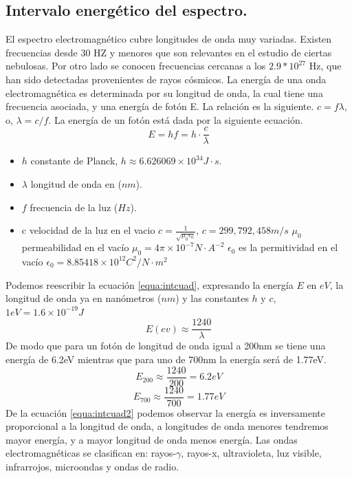 \subsection{Intervalo energético del espectro.}
El espectro electromagnético cubre longitudes de onda muy variadas. Existen frecuencias desde 30 HZ y menores que son relevantes en el estudio de ciertas nebulosas. Por otro lado se conocen frecuencias cercanas a los  $2.9*10^{27}$ Hz, que han sido detectadas provenientes de rayos cósmicos.
La energía de una onda electromagnética es determinada por su longitud de onda, la cual tiene una frecuencia asociada, y una energía de fotón E. La relación es la siguiente.
$c = f\lambda$, o, $\lambda = c/f$. La energía de un fotón está dada por la siguiente ecuación.
\begin{equation}
E = hf =h\cdot \frac{c}{\lambda}
\label{equa:intcuad}
\end{equation}
\begin{itemize}
	\item $h$ constante de Planck, $h \approx 6.626069\times 10^{34} J\cdot s$.
	\item $\lambda$ longitud de onda en ($nm$).
	\item $f$ frecuencia de la luz ($Hz$).
	\item c velocidad de la luz en el vacio $c = \frac{1}{\sqrt{\mu_0\epsilon_0}}$, $c = 299,792,458 m/s$
	\subitem $\mu_0$ permeabilidad en el vacío $\mu_0 = 4\pi\times10^{-7} N\cdot A^{-2}$
	\subitem $\epsilon_0$ es la permitividad en el vacío $\epsilon_0 = 8.85418\times10^{12} C^2/N\cdot m^2$
	
\end{itemize}
Podemos reescribir la ecuación \ref{equa:intcuad}, expresando la energía $E$ en $eV$, la longitud de onda ya en nanómetros ($nm$) y las constantes $h$ y $c$, $1eV = 1.6\times 10^{-19} J$
\begin{equation}
E(ev)\approx \frac{1240}{\lambda}
\label{equa:intcuad2}
\end{equation}
De modo que para un fotón de longitud de onda igual a 200nm se tiene una energía de 6.2eV mientras que para uno de 700nm la energía será de 1.77eV.
$$E_{200}\approx \frac{1240}{200}=6.2eV $$
$$E_{700}\approx \frac{1240}{700}=1.77eV $$
De la ecuación \ref{equa:intcuad2} podemos observar la energía es inversamente proporcional a la longitud de onda, a longitudes de onda menores tendremos mayor energía, y a mayor longitud de onda menos energía.
Las ondas electromagnéticas se clasifican en: rayos-$\gamma$, rayos-x, ultravioleta, luz visible, infrarrojos, microondas y ondas de radio.

